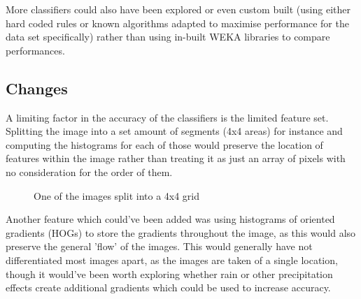 \documentclass[a4paper,12pt,twoside]{report}
\begin{document}
More classifiers could also have been explored or even custom built (using either hard coded rules or known algorithms adapted to maximise performance for the data set specifically)  rather than using in-built WEKA libraries to compare performances.

\subsection{Changes}
A limiting factor in the accuracy of the classifiers is the limited feature set. Splitting the image into a set amount of segments (4x4 areas) for instance and computing the histograms for each of those would preserve the location of features within the image rather than treating it as just an array of pixels with no consideration for the order of them.
\begin{figure}[H]
  \centering
  \caption{One of the images split into a 4x4 grid}
\end{figure}

Another feature which could've been added was using histograms of oriented gradients (HOGs) to store the gradients throughout the image, as this would also preserve the general 'flow' of the images. This would generally have not differentiated most images apart, as the images are taken of a single location, though it would've been worth exploring whether rain or other precipitation effects create additional gradients which could be used to increase accuracy.
\end{document}
